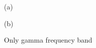 \begin{figure}[h!]
\begin{minipage}[h]{0.49\linewidth}
 (a) \\
\end{minipage}
\hfill
\begin{minipage}[h]{0.5\linewidth}
 (b) \\
\end{minipage}
\caption{Only gamma frequency band} 
\end{figure}

